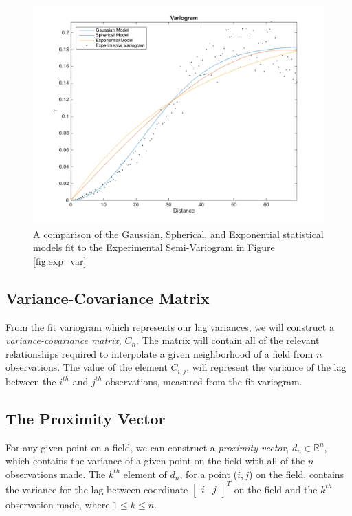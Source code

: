 \documentclass[11pt]{ucthesis}
\begin{document}
\begin{figure}[ht!]
    \centering    
	\includegraphics[width=\linewidth]{figures/fit_kern_comp.png}
	\captionsetup{skip=0.5\baselineskip,size=footnotesize}
	\caption{A comparison of the Gaussian, Spherical, and Exponential statistical models fit to the Experimental Semi-Variogram in Figure \ref{fig:exp_var}}
	\label{fig:kern_fit}
\end{figure}

\subsection{Variance-Covariance Matrix}
From the fit variogram which represents our lag variances, we will construct a \textit{variance-covariance matrix}, $C_n$. The matrix will contain all of the relevant relationships required to interpolate a given neighborhood of a field from $n$ observations. The value of the element $C_{i,j}$, will represent the variance of the lag between the $i^{th}$ and $j^{th}$ observations, measured from the fit variogram.

\subsection{The Proximity Vector}
For any given point on a field, we can construct a \textit{proximity vector}, $d_n \in \mathbb{R}^n$, which contains the variance of a given point on the field with all of the $n$ observations made. The $k^{th}$ element of $d_n$, for a point ($i,j$) on the field, contains the variance for the lag between coordinate $\begin{bmatrix} i & j \end{bmatrix}^{T}$ on the field and the $k^{th}$ observation made, where $1 \leq k \leq n$.
\end{document}
